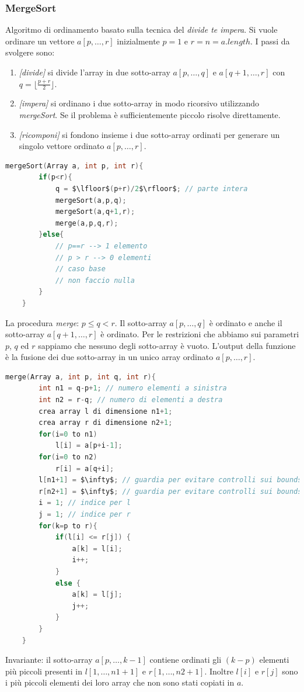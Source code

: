 \documentclass[italian]{article}
\begin{document}
\pagebreak
\subsubsection{MergeSort}
Algoritmo di ordinamento basato sulla tecnica del \textit{divide te impera}. Si vuole ordinare un vettore $a[p,\dots,r]$ inizialmente $p=1$ e $r=n=a.length$. I passi da svolgere sono:
\begin{enumerate}[itemsep=0pt,label=\arabic*)]
	\item \textit{[divide]} si divide l’array in due sotto-array $a[p,\dots,q]$ e $a[q+1,\dots,r]$ con $q = \lfloor \frac{p+r}{2}\rfloor$.
	\item \textit{[impera]} si ordinano i due sotto-array in modo ricorsivo utilizzando \textit{mergeSort}. Se il problema è sufficientemente piccolo risolve direttamente.
	\item \textit{[ricomponi]} si fondono insieme i due sotto-array ordinati per generare un singolo vettore ordinato $a[p,\dots,r]$.
\end{enumerate}
\begin{lstlisting}[language=c,mathescape=true]
	mergeSort(Array a, int p, int r){
		if(p<r){
			q = $\lfloor$(p+r)/2$\rfloor$; // parte intera
			mergeSort(a,p,q);
			mergeSort(a,q+1,r);
			merge(a,p,q,r);
		}else{
			// p==r --> 1 elemento
			// p > r --> 0 elementi
			// caso base
			// non faccio nulla
		}
	}
\end{lstlisting}
La procedura \textit{merge}: $p \leq q < r$. Il sotto-array $a[p,\dots,q]$ è ordinato e anche il sotto-array $a[q+1,\dots,r]$ è ordinato. Per le restrizioni che abbiamo sui parametri $p$, $q$ ed $r$ sappiamo che nessuno degli sotto-array è vuoto. L’output della funzione è la fusione dei due sotto-array in un unico array ordinato $a[p,\dots,r]$.
\begin{lstlisting}[language=c,mathescape=true]
	merge(Array a, int p, int q, int r){
		int n1 = q-p+1; // numero elementi a sinistra
		int n2 = r-q; // numero di elementi a destra
		crea array l di dimensione n1+1;
		crea array r di dimensione n2+1;	
		for(i=0 to n1)
			l[i] = a[p+i-1];
		for(i=0 to n2)
			r[i] = a[q+i];
		l[n1+1] = $\infty$; // guardia per evitare controlli sui bounds
		r[n2+1] = $\infty$; // guardia per evitare controlli sui bounds
		i = 1; // indice per l
		j = 1; // indice per r
		for(k=p to r){
			if(l[i] <= r[j]) {
				a[k] = l[i];
				i++;
			}
			else { 
				a[k] = l[j];
				j++;
			}
		}
	}
\end{lstlisting}
Invariante: il sotto-array $a[p,\dots,k-1]$ contiene ordinati gli $(k-p)$ elementi più piccoli presenti in  $l[1,\dots,n1+1]$ e $r[1,\dots,n2+1]$. Inoltre $l[i]$ e $r[j]$ sono i più piccoli elementi dei loro array che non sono stati copiati in $a$.
\end{document}
